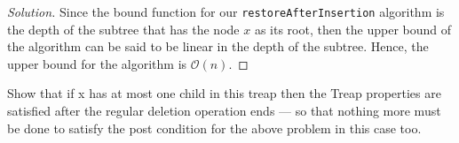 \documentclass[12pt]{article}
\newenvironment{problem}[2][Problem]{\begin{trivlist}
\item[\hskip \labelsep {\bfseries #1}\hskip \labelsep {\bfseries #2.}]}{\end{trivlist}}
\newenvironment{solution}{\renewcommand\qedsymbol{$\blacksquare$}\begin{proof}[Solution]}{\end{proof}}
\begin{document}
\begin{solution}
    Since the bound function for our \texttt{restoreAfterInsertion} algorithm is the depth of the subtree that has the node $x$ as its root, then the upper bound of the algorithm can be said to be linear in the depth of the subtree. Hence, the upper bound for the algorithm is $\mathcal{O}(n)$.
\end{solution}


\begin{problem}{6}
    Show that if x has at most one child in this treap then the Treap properties are satisfied after the regular deletion operation ends — so that nothing more must be done to satisfy the post condition for the above problem in this case too.
\end{problem}
\end{document}
